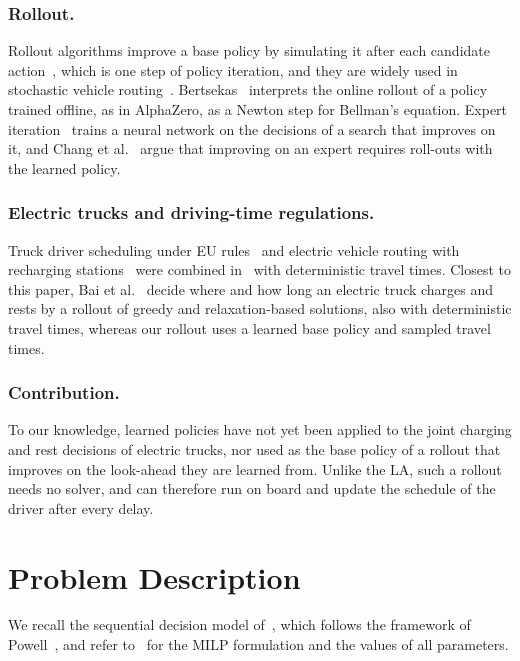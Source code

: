 \documentclass[runningheads]{llncs}
\begin{document}
\subsubsection{Rollout.}
Rollout algorithms improve a base policy by simulating it after each candidate
action~\cite{tesauro1996,bertsekas1997}, which is one step of policy
iteration, and they are widely used in stochastic vehicle
routing~\cite{goodson2017,kullman2021}. Bertsekas~\cite{bertsekas2022}
interprets the online rollout of a policy trained offline, as in AlphaZero, as
a Newton step for Bellman's equation. Expert iteration~\cite{anthony2017}
trains a neural network on the decisions of a search that improves on it, and
Chang et al.~\cite{chang2015lols} argue that improving on an expert requires
roll-outs with the learned policy.

\subsubsection{Electric trucks and driving-time regulations.}
Truck driver scheduling under EU rules~\cite{goel2010,garaix2024} and electric
vehicle routing with recharging stations~\cite{schneider2014,montoya2017} were
combined in~\cite{schiffer2017,brockmann2025} with deterministic travel times.
Closest to this paper, Bai et al.~\cite{bai2023} decide where and how long an
electric truck charges and rests by a rollout of greedy and relaxation-based
solutions, also with deterministic travel times, whereas our rollout uses a
learned base policy and sampled travel times.

\subsubsection{Contribution.}
To our knowledge, learned policies have not yet been applied to the joint
charging and rest decisions of electric trucks, nor used as the base policy of
a rollout that improves on the look-ahead they are learned from. Unlike the
LA, such a rollout needs no solver, and can therefore run on board and update
the schedule of the driver after every delay.

\section{Problem Description}
\label{sec:problem}

We recall the sequential decision model of~\cite{pagnier2026scheduling},
which follows the framework of Powell~\cite{powell2019}, and refer
to~\cite{pagnier2026scheduling} for the MILP formulation and the values of all
parameters.
\end{document}
